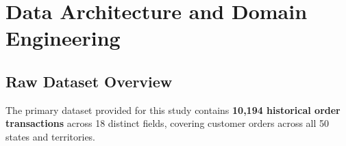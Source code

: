 \documentclass[12pt]{article}
\begin{document}
\newpage

\section{Data Architecture and Domain Engineering}

\subsection{Raw Dataset Overview}

The primary dataset provided for this study contains \textbf{10,194 historical order transactions} across 18 distinct fields, covering customer orders across all 50 states and territories.
\end{document}
